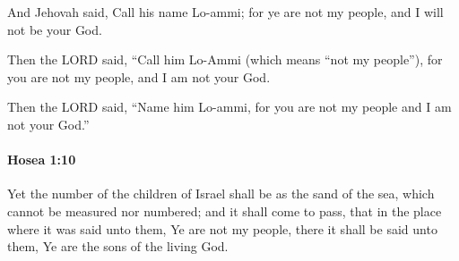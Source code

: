 			\begin{versebox}
					\item[BHS] 
					\item[LXX] 
					\item[ASV] And Jehovah said, Call his name Lo-ammi; for ye are not my people, and I will not be your God.
					\item[NIV] Then the LORD said, “Call him Lo-Ammi (which means “not my people”), for you are not my people, and I am not your God.
					\item[NRSV] Then the LORD said, “Name him Lo-ammi, for you are not my people and I am not your God.”
			\end{versebox}

		\paragraph{Hosea 1:10} %
			\label{HOSEA-1-10}

			Yet the number of the children of Israel shall be as the sand of the sea, which cannot be measured nor numbered; and it shall come to pass, that in the place where it was said unto them, Ye are not my people, there it shall be said unto them, Ye are the sons of the living God.


